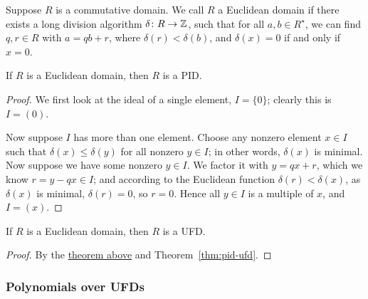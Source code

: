 \begin{definition}
    Suppose \(R\) is a commutative domain.
    We call \(R\) a Euclidean domain if there exists a long division algorithm
    \(\delta\colon R\to\mathbb{Z}\),
    such that for all \(a,b \in R^\star\),
    we can find \(q,r \in R\) with \(a = qb + r\),
    where \(\delta(r) < \delta(b)\),
    and \(\delta(x) = 0\) if and only if \(x = 0\).
\end{definition}
\begin{theorem}\label{thm:euclidean-pid}
    If \(R\) is a Euclidean domain,
    then \(R\) is a PID.\@
\end{theorem}
\begin{proof}
    We first look at the ideal of a single element, \(I = \{0\}\);
    clearly this is \(I = (0)\).

    Now suppose \(I\) has more than one element.
    Choose any nonzero element \(x \in I\)
    such that \(\delta(x) \leq \delta(y)\) for all nonzero \(y \in I\);
    in other words, \(\delta(x)\) is minimal.
    Now suppose we have some nonzero \(y \in I\).
    We factor it with \(y = qx + r\),
    which we know \(r = y - qx \in I\);
    and according to the Euclidean function \(\delta(r) < \delta(x)\),
    as \(\delta(x)\) is minimal, \(\delta(r) = 0\), so \(r = 0\).
    Hence all \(y \in I\) is a multiple of \(x\),
    and \(I = (x)\).
\end{proof}
\begin{corollary}\label{cor:euclidean-ufd}
    If \(R\) is a Euclidean domain,
    then \(R\) is a UFD.\@
\end{corollary}
\begin{proof}
    By the \hyperref[thm:euclidean-pid]{theorem above}
    and Theorem~\ref{thm:pid-ufd}.
\end{proof}

\subsubsection*{Polynomials over UFDs}

